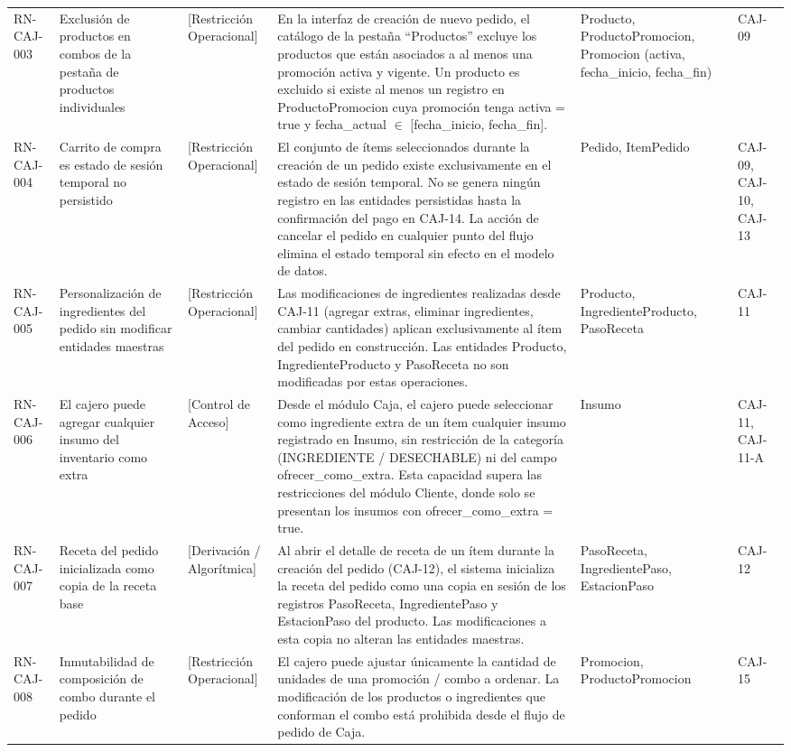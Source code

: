 \begin{landscape}
\begin{longtable}[c]{l p{2.1cm} p{2.1cm} p{8cm} p{4cm} p{3cm}}
RN-CAJ-003 & Exclusión de productos en combos de la pestaña de productos individuales & [Restricción Operacional] & En la interfaz de creación de nuevo pedido, el catálogo de la pestaña ``Productos'' excluye los productos que están asociados a al menos una promoción activa y vigente. Un producto es excluido si existe al menos un registro en ProductoPromocion cuya promoción tenga activa = true y fecha\_actual $\in$ [fecha\_inicio, fecha\_fin]. & Producto, ProductoPromocion, Promocion (activa, fecha\_inicio, fecha\_fin) & CAJ-09 \\
\addlinespace
RN-CAJ-004 & Carrito de compra es estado de sesión temporal no persistido & [Restricción Operacional] & El conjunto de ítems seleccionados durante la creación de un pedido existe exclusivamente en el estado de sesión temporal. No se genera ningún registro en las entidades persistidas hasta la confirmación del pago en CAJ-14. La acción de cancelar el pedido en cualquier punto del flujo elimina el estado temporal sin efecto en el modelo de datos. & Pedido, ItemPedido & CAJ-09, CAJ-10, CAJ-13 \\
\addlinespace
RN-CAJ-005 & Personalización de ingredientes del pedido sin modificar entidades maestras & [Restricción Operacional] & Las modificaciones de ingredientes realizadas desde CAJ-11 (agregar extras, eliminar ingredientes, cambiar cantidades) aplican exclusivamente al ítem del pedido en construcción. Las entidades Producto, IngredienteProducto y PasoReceta no son modificadas por estas operaciones. & Producto, IngredienteProducto, PasoReceta & CAJ-11 \\
\addlinespace
RN-CAJ-006 & El cajero puede agregar cualquier insumo del inventario como extra & [Control de Acceso] & Desde el módulo Caja, el cajero puede seleccionar como ingrediente extra de un ítem cualquier insumo registrado en Insumo, sin restricción de la categoría (INGREDIENTE / DESECHABLE) ni del campo ofrecer\_como\_extra. Esta capacidad supera las restricciones del módulo Cliente, donde solo se presentan los insumos con ofrecer\_como\_extra = true. & Insumo & CAJ-11, CAJ-11-A \\
\addlinespace
RN-CAJ-007 & Receta del pedido inicializada como copia de la receta base & [Derivación / Algorítmica] & Al abrir el detalle de receta de un ítem durante la creación del pedido (CAJ-12), el sistema inicializa la receta del pedido como una copia en sesión de los registros PasoReceta, IngredientePaso y EstacionPaso del producto. Las modificaciones a esta copia no alteran las entidades maestras. & PasoReceta, IngredientePaso, EstacionPaso & CAJ-12 \\
\addlinespace
RN-CAJ-008 & Inmutabilidad de composición de combo durante el pedido & [Restricción Operacional] & El cajero puede ajustar únicamente la cantidad de unidades de una promoción / combo a ordenar. La modificación de los productos o ingredientes que conforman el combo está prohibida desde el flujo de pedido de Caja. & Promocion, ProductoPromocion & CAJ-15 \\
\end{longtable}
\endgroup


\end{landscape}
